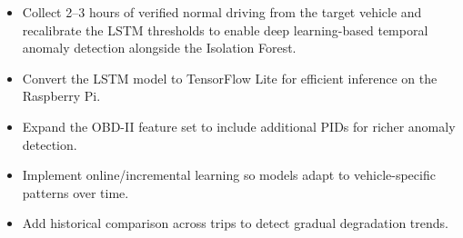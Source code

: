 \begin{itemize}
    \item Collect 2--3 hours of verified normal driving from the target vehicle and recalibrate the LSTM thresholds to enable deep learning-based temporal anomaly detection alongside the Isolation Forest.
    \item Convert the LSTM model to TensorFlow Lite for efficient inference on the Raspberry Pi.
    \item Expand the OBD-II feature set to include additional PIDs for richer anomaly detection.
    \item Implement online/incremental learning so models adapt to vehicle-specific patterns over time.
    \item Add historical comparison across trips to detect gradual degradation trends.
\end{itemize}
